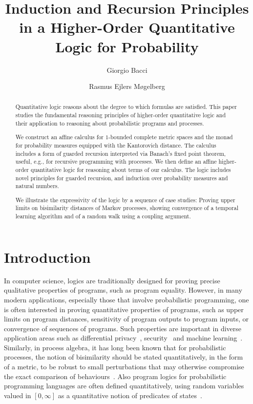 \documentclass[a4paper,UKenglish,cleveref, autoref, thm-restate]{lipics-v2021}
\title{Induction and Recursion Principles in a Higher-Order Quantitative Logic for Probability} %
\author{Giorgio Bacci}{Department of Computer Science, Aalborg University, Denmark \and \url{https://homes.cs.aau.dk/~grbacci/}}{grbacci@cs.aau.dk}{https://orcid.org/0000-0003-4004-6049}{This work was supported by Digital Research Centre Denmark (DIREC), under the Robust NIDS project.}
\author{Rasmus Ejlers M{\o}gelberg}{IT University of Copenhagen, Denmark \and \url{https://www.itu.dk/~mogel/}}{mogel@itu.dk}{https://orcid.org/0000-0003-0386-4376}{{This work was supported by the Independent Research Fund Denmark, grant number 2032-00134B.}}
\newcommand{\extpreals}{[0,\infty]}
\begin{document}
\maketitle

\begin{abstract}
Quantitative logic reasons about the degree to which formulas are satisfied. 
This paper studies the fundamental reasoning principles of higher-order quantitative logic and their application to reasoning about probabilistic programs and processes. 

We construct an affine calculus for $1$-bounded complete metric spaces and the monad for probability measures equipped with the Kantorovich distance. The calculus includes a form of guarded recursion interpreted via Banach's fixed point theorem, useful, e.g., for recursive programming with processes. We then define an affine higher-order quantitative logic for reasoning about terms of our calculus. The logic includes novel principles for guarded recursion, and induction over probability measures and natural numbers.

We illustrate the expressivity of the logic by a sequence of case studies: Proving upper limits on bisimilarity distances of Markov processes, showing convergence of 
a temporal learning algorithm and of a random walk using a coupling argument. 
\end{abstract}

\section{Introduction}

In computer science, logics are traditionally designed for proving precise qualitative properties of programs, such as program equality. 
However, in many modern applications, especially those that involve probabilistic programming, one is often interested 
in proving quantitative properties of programs, such as upper limits on program distances, sensitivity of program 
outputs to program inputs, or convergence of sequences of programs. Such properties are important in diverse
application areas such as differential privacy~\cite{AmorimGHKC17,ReedP10}, security~\cite{AlmeidaBBGLLOPQSSS23,AvanziniBGMV24} and machine learning~\cite{OlmedoKKM16}. 
Similarly, in process algebra, it has long been known that for probabilistic processes, the notion of bisimilarity should be stated
quantitatively, in the form of a metric, 
to be robust to small perturbations that may otherwise compromise the exact comparison of behaviours~\cite{GiacaloneJS94,Desharnais00}.
Also program logics for probabilistic programming languages are often defined quantitatively, using 
random variables valued in $\extpreals$ as a 
quantitative notion of predicates of states~\cite{Kozen85,MorganMS96,McIverM05,BHKKM21,AvanziniBDG25}. 
\end{document}
